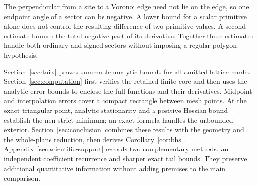 The perpendicular from a site to a Voronoi edge need not lie on the
edge, so one endpoint angle of a sector can be negative.  A lower bound
for a scalar primitive alone does not control the resulting difference
of two primitive values.  A second estimate bounds the total negative
part of its derivative.  Together these estimates handle both ordinary
and signed sectors without imposing a regular-polygon hypothesis.

Section~\ref{sec:tails} proves summable analytic bounds for all omitted
lattice modes.  Section~\ref{sec:computation} first verifies the retained
finite core and then uses the analytic error bounds to enclose the full
functions and their derivatives.  Midpoint and interpolation errors
cover a compact rectangle between mesh points.  At the exact triangular
point, analytic stationarity and a positive Hessian bound establish the
non-strict minimum; an exact formula handles the unbounded exterior.
Section~\ref{sec:conclusion} combines these results with the geometry
and the whole-plane reduction, then derives Corollary~\ref{cor:bhs}.
Appendix~\ref{sec:scientific-support}
records two complementary methods: an independent coefficient recurrence
and sharper exact tail bounds.  They preserve additional quantitative
information without adding premises to the main comparison.
